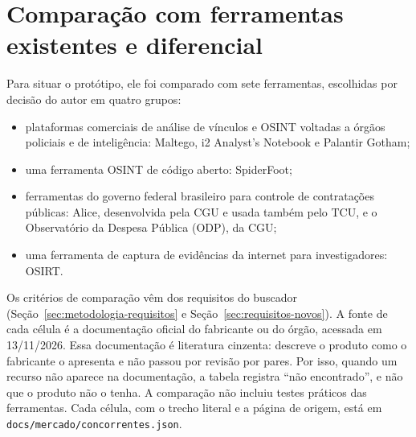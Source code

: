 \section{Comparação com ferramentas existentes e diferencial}
\label{sec:requisitos-mercado}

Para situar o protótipo, ele foi comparado com sete ferramentas, escolhidas
por decisão do autor em quatro grupos:
\begin{itemize}
	\item plataformas comerciais de análise de vínculos e OSINT voltadas a
	órgãos policiais e de inteligência: Maltego, i2 Analyst's Notebook e
	Palantir Gotham;
	\item uma ferramenta OSINT de código aberto: SpiderFoot;
	\item ferramentas do governo federal brasileiro para controle de
	contratações públicas: Alice, desenvolvida pela CGU e usada também pelo
	TCU, e o Observatório da Despesa Pública (ODP), da CGU;
	\item uma ferramenta de captura de evidências da internet para
	investigadores: OSIRT.
\end{itemize}
Os critérios de comparação vêm dos requisitos do buscador (Seção~\ref{sec:metodologia-requisitos}
e Seção~\ref{sec:requisitos-novos}). A fonte de cada célula é a documentação
oficial do fabricante ou do órgão, acessada em 13/11/2026. Essa documentação
é literatura cinzenta: descreve o produto como o fabricante o apresenta e não
passou por revisão por pares. Por isso, quando um recurso não aparece na
documentação, a tabela registra ``não encontrado'', e não que o produto não o
tenha. A comparação não incluiu testes práticos das ferramentas. Cada célula,
com o trecho literal e a página de origem, está em
\texttt{docs/mercado/concorrentes.json}.



